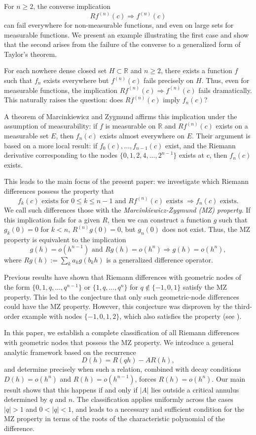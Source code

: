 \documentclass{raex}
\theoremstyle{definition}
\begin{document}
For $n \geq 2$, the converse implication
\[
Rf^{(n)}(c) \Rightarrow f^{(n)}(c)
\]
can fail everywhere for non-measurable functions, and even on large sets for measurable functions. We present an example illustrating the first case and show that the second arises from the failure of the converse to a generalized form of Taylor’s theorem.

For each nowhere dense closed set $H \subset \mathbb{R}$ and $n \geq 2$, there exists a function $f$ such that $f_n$ exists everywhere but $f^{(n)}(c)$ fails precisely on $H$. Thus, even for measurable functions, the implication $Rf^{(n)}(c) \Rightarrow f^{(n)}(c)$ fails dramatically. This naturally raises the question: does $Rf^{(n)}(c)$ imply $f_n(c)$?

A theorem of Marcinkiewicz and Zygmund affirms this implication under the assumption of measurability: if $f$ is measurable on $\mathbb{R}$ and $Rf^{(n)}(c)$ exists on a measurable set $E$, then $f_n(c)$ exists almost everywhere on $E$. Their argument is based on a more local result: if $f_0(c),\dots,f_{n-1}(c)$ exist, and the Riemann derivative corresponding to the nodes $\{0,1,2,4,\dots,2^{n-1}\}$ exists at $c$, then $f_n(c)$ exists.

This leads to the main focus of the present paper: we investigate which Riemann differences possess the property that
\[
f_k(c) \text{ exists for } 0 \leq k \leq n-1 \text{ and } Rf^{(n)}(c) \text{ exists } \Rightarrow f_n(c) \text{ exists}.
\]
We call such differences those with the \emph{Marcinkiewicz-Zygmund (MZ) property}. If this implication fails for a given $R$, then we can construct a function $g$ such that $g_k(0) = 0$ for $k < n$, $R^{(n)}g(0) = 0$, but $g_n(0)$ does not exist. Thus, the MZ property is equivalent to the implication
\[
g(h) = o(h^{n-1}) \text{ and } Rg(h) = o(h^n) \Rightarrow g(h) = o(h^n),
\]
where $Rg(h) := \sum_k a_k g(b_k h)$ is a generalized difference operator.

Previous results have shown that Riemann differences with geometric nodes of the form $\{0,1,q,\dots,q^{n-1}\}$ or $\{1,q,\dots,q^n\}$ for $q \notin \{-1,0,1\}$ satisfy the MZ property. This led to the conjecture that only such geometric-node differences could have the MZ property. However, this conjecture was disproven by the third-order example with nodes $\{-1,0,1,2\}$, which also satisfies the property (see \cite{CF2}).

In this paper, we establish a complete classification of all Riemann differences with geometric nodes that possess the MZ property. We introduce a general analytic framework based on the recurrence
\[
D(h) = R(qh) - A R(h),
\]
and determine precisely when such a relation, combined with decay conditions $D(h) = o(h^n)$ and $R(h) = o(h^{n-1})$, forces $R(h) = o(h^n)$. Our main result shows that this happens if and only if $|A|$ lies outside a critical annulus determined by $q$ and $n$. The classification applies uniformly across the cases $|q| > 1$ and $0 < |q| < 1$, and leads to a necessary and sufficient condition for the MZ property in terms of the roots of the characteristic polynomial of the difference.
\end{document}
